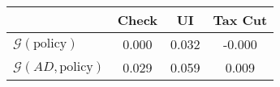 \begin{tabular}{@{}lccc@{}} 
\toprule 
                          & Check      & UI    & Tax Cut    \\  \midrule 
$\mathcal{G}(\text{policy})$ & 0.000  & 0.032  & -0.000     \\ 
$\mathcal{G}(AD,\text{policy})$ & 0.029  & 0.059  & 0.009     \\ 
\end{tabular}  
